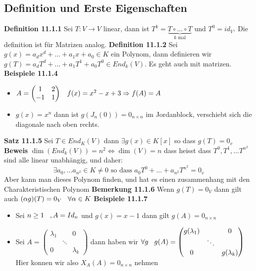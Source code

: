 \documentclass{article}
\newcommand{\smspc}{\hspace{0.3cm}}
\begin{document}
\subsection{Definition und Erste Eigenschaften}\textbf{Definition 11.1.1} Sei $T:V\rightarrow V$ linear, dann ist $T^k=\underset{k\text{ mal}}{\underbrace{T\circ...\circ T}}$ und $T^0=id_V$. Die definition ist für Matrizen analog.\newline
\textbf{Definition 11.1.2} Sei $g(x)=a_dx^d+...+a_1x+a_0\in K$ ein Polynom, dann definieren wir $g(T)=a_dT^d+...+a_1T^1+a_0T^0\in End_k(V)$. Es geht auch mit matrizen.
\newline\textbf{Beispiele 11.1.4}
\begin{itemize}
  \item{$A=\begin{pmatrix}1&2\\-1&1\end{pmatrix}\smspc f(x)=x^2-x+3\Rightarrow f(A)=A$}
  \item{$g(x)=x^n$ dann ist $g(J_n(0))=0_{n\times n}$ im Jordanblock, verschiebt sich die diagonale nach oben rechts.}
\end{itemize}
\textbf{Satz 11.1.5} Sei $T\in End_K(V)$ dann $\exists g(x)\in K[x]$ so dass $g(T)=0_v$
\newline\textbf{Beweis} $\dim(End_k(V))=n^2\Leftrightarrow\dim(V)=n$ dass heisst dass $T^0,T^1,...T^{n^2}$ sind alle linear unabhängig, und daher:\[\exists a_0,...a_{n^2}\in K \neq 0\text{ so dass }a_0T^0+...+a_{n^2}T^{n^2}=0_v\]
\newline Aber kann man dieses Polynom finden, und hat es einen zusammenhang mit den Charakteristischen Polynom\newline
\textbf{Bemerkung 11.1.6} Wenn $g(T)=0_V$ dann gilt auch $(\alpha g)(T)=0_V\smspc \forall \alpha \in K$
\newline\textbf{Beispiele 11.1.7}\begin{itemize}
  \item{Sei $n\ge1\smspc, A=Id_n$ und $g(x)=x-1$ dann gilt $g(A)=0_{n\times n}$}
  \item{Sei $A=\begin{pmatrix}\lambda_1&\left.\right.&0\\\left.\right.&\ddots&\left.\right.\\0&\left.\right.&\lambda_k\end{pmatrix}$ dann haben wir
    $\forall g\smspc g(A)=\begin{pmatrix}g(\lambda_1)&\left.\right.&0\\\left.\right.&\ddots&\left.\right.\\0&\left.\right.&g(\lambda_k)\end{pmatrix}$ Hier konnen wir also $X_A(A)=0_{n\times n}$ nehmen}
\end{itemize}
\end{document}
